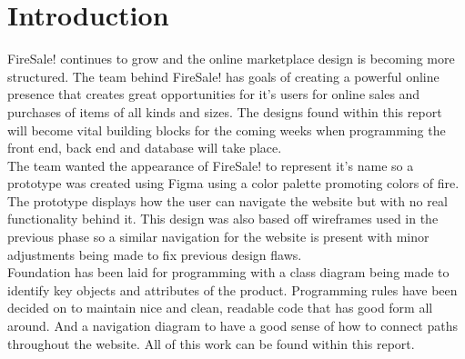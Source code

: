 \section{Introduction}

FireSale! continues to grow and the online marketplace design is becoming more structured. The team behind FireSale! has goals of creating a powerful online presence that creates great opportunities for it's users for online sales and purchases of items of all kinds and sizes. The designs found within this report will become vital building blocks for the coming weeks when programming the front end, back end and database will take place. \\

 The team wanted the appearance of FireSale! to represent it's name so a prototype was created using Figma using a color palette promoting colors of fire. The prototype displays how the user can navigate the website but with no real functionality behind it. This design was also based off wireframes used in the previous phase so a similar navigation for the website is present with minor adjustments being made to fix previous design flaws. \\

 Foundation has been laid for programming with a class diagram being made to identify key objects and attributes of the product. Programming rules have been decided on to maintain nice and clean, readable code that has good form all around. And a navigation diagram to have a good sense of how to connect paths throughout the website. All of this work can be found within this report. \\\\